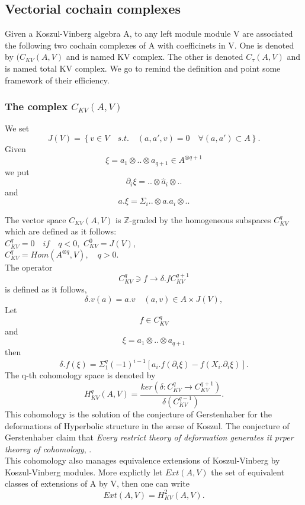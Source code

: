 \subsection{Vectorial cochain complexes }
Given a Koszul-Vinberg algebra A, to any left module module V are associated the following two cochain complexes of A with coefficinets in V. One is denoted by $(C_{KV}(A,V)$ and is named KV complex. The other is denoted $C_\tau(A,V)$ and is named total KV complex. We go to remind the definition and point some framework of their efficiency.\\
\subsubsection{The complex $C_{KV}(A,V)$}
We set 
$$J(V) =\left\{v \in V\quad s.t.\quad (a,a',v) = 0 \quad 
\forall (a,a')\subset A\right\}.$$
Given 
$$\xi = a_1\otimes..\otimes a_{q+1} \in A^{\otimes q+1}$$
we put
$$\partial_i\xi = ..\otimes \hat{a}_i \otimes..$$
and 
$$a.\xi = \Sigma_i ..\otimes a.a_i\otimes..$$

The vector space $C_{KV}(A,V)$ is $\mathbb{Z}$-graded by the homogeneous subspaces $C^q_{KV}$ which are defined as it follows:\\

$C^q_{KV} = 0 \quad if \quad q < 0, $
$C^0_{KV} = J(V)$,\\
$C^q_{KV} = Hom(A^{\otimes q},V),\quad q > 0.$\\
The operator 
$$C^q_{KV}\ni f \rightarrow \delta.f C^{q+1}_{KV}$$
is defined as it follows,
$$\delta.v(a) = a.v \quad (a,v) \in A \times J(V),$$
Let $$f \in C^q_{KV}$$
and 
$$\xi = a_1\otimes.. \otimes a_{q+1}$$
then
$$\delta.f (\xi) = \Sigma^q_1 (-1)^{i-1}[a_i.f(\partial_i\xi) - f(X_i.\partial_i\xi)].$$
The q-th cohomology space is denoted by
$$H^q_{KV}(A,V) = \frac{ker(\delta: C^q_{KV}\rightarrow C^{q+1}_{KV})}{\delta (C^{q-1}_{KV})}.$$
This cohomology is the solution of the conjecture of Gerstenhaber for the deformations of Hyperbolic structure in the sense of Koszul. The conjecture of Gerstenhaber claim that \textit{Every restrict theory of deformation generates it prper theorey of cohomology}, \cite{Gerstenbaher}.\\
This cohomology also manages equivalence extensions of Koszul-Vinberg by Koszul-Vinberg modules. More explictly let $Ext(A,V)$ the set of equivalent classes of extensions of A by V, then one can write 
$$Ext(A,V) = H^2_{KV}(A,V).$$

